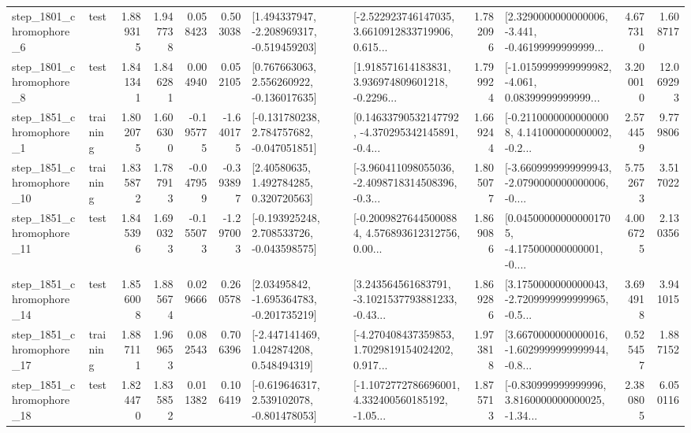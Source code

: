 \begin{tabular}{llrrrrllrlrr}
  step\_1801\_chromophore\_6 &      test &      1.889315 &    1.947738 &      0.058423 &  0.503038 &   [1.494337947, -2.208969317, -0.519459203] &  [-2.522923746147035, 3.6610912833719906, 0.615... &       1.782096 &  [2.3290000000000006, -3.441, -0.46199999999999... &            4.677310 &          1.608717 \\
  step\_1801\_chromophore\_8 &      test &      1.841341 &    1.846281 &      0.004940 &  0.052105 &    [0.767663063, 2.556260922, -0.136017635] &  [1.918571614183831, 3.936974809601218, -0.2296... &       1.799924 &  [-1.0159999999999982, -4.061, 0.08399999999999... &            3.200010 &         12.069293 \\
  step\_1851\_chromophore\_1 &  training &      1.802075 &    1.606300 &     -0.195775 & -1.640175 &   [-0.131780238, 2.784757682, -0.047051851] &  [0.14633790532147792, -4.370295342145891, -0.4... &       1.669244 &  [-0.21100000000000008, 4.141000000000002, -0.2... &            2.574459 &          9.779806 \\
 step\_1851\_chromophore\_10 &  training &      1.835872 &    1.787913 &     -0.047959 & -0.393897 &      [2.40580635, 1.492784285, 0.320720563] &  [-3.960411098055036, -2.4098718314508396, -0.3... &       1.805077 &  [-3.6609999999999943, -2.0790000000000006, -0.... &            5.752673 &          3.517022 \\
 step\_1851\_chromophore\_11 &      test &      1.845396 &    1.690323 &     -0.155073 & -1.297003 &   [-0.193925248, 2.708533726, -0.043598575] &  [-0.20098276445000884, 4.576893612312756, 0.00... &       1.869086 &  [0.045000000000001705, -4.175000000000001, -0.... &            4.006725 &          2.130356 \\
 step\_1851\_chromophore\_14 &      test &      1.856008 &    1.885674 &      0.029666 &  0.260578 &    [2.03495842, -1.695364783, -0.201735219] &  [3.243564561683791, -3.1021537793881233, -0.43... &       1.869286 &  [3.1750000000000043, -2.7209999999999965, -0.5... &            3.694918 &          3.941015 \\
 step\_1851\_chromophore\_17 &  training &      1.887111 &    1.969653 &      0.082543 &  0.706396 &    [-2.447141469, 1.042874208, 0.548494319] &  [-4.270408437359853, 1.7029819154024202, 0.917... &       1.973818 &  [3.6670000000000016, -1.6029999999999944, -0.8... &            0.525457 &          1.887152 \\
 step\_1851\_chromophore\_18 &      test &      1.824470 &    1.835852 &      0.011382 &  0.106419 &   [-0.619646317, 2.539102078, -0.801478053] &  [-1.1072772786696001, 4.332400560185192, -1.05... &       1.875713 &  [-0.830999999999996, 3.8160000000000025, -1.34... &            2.380805 &          6.050116 \\

\end{tabular}
